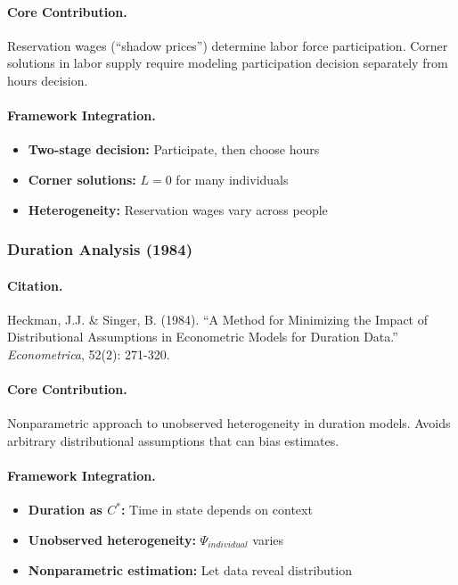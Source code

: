 \paragraph{Core Contribution.}
Reservation wages (``shadow prices'') determine labor force participation.
Corner solutions in labor supply require modeling participation decision
separately from hours decision.

\paragraph{Framework Integration.}
\begin{itemize}
  \item \textbf{Two-stage decision:} Participate, then choose hours
  \item \textbf{Corner solutions:} $L = 0$ for many individuals
  \item \textbf{Heterogeneity:} Reservation wages vary across people
\end{itemize}

\subsubsection{Duration Analysis (1984)}

\paragraph{Citation.}
Heckman, J.J. \& Singer, B. (1984). ``A Method for Minimizing the Impact
of Distributional Assumptions in Econometric Models for Duration Data.''
\emph{Econometrica}, 52(2): 271-320.

\paragraph{Core Contribution.}
Nonparametric approach to unobserved heterogeneity in duration models.
Avoids arbitrary distributional assumptions that can bias estimates.

\paragraph{Framework Integration.}
\begin{itemize}
  \item \textbf{Duration as $C^*$:} Time in state depends on context
  \item \textbf{Unobserved heterogeneity:} $\Psi_{individual}$ varies
  \item \textbf{Nonparametric estimation:} Let data reveal distribution
\end{itemize}

